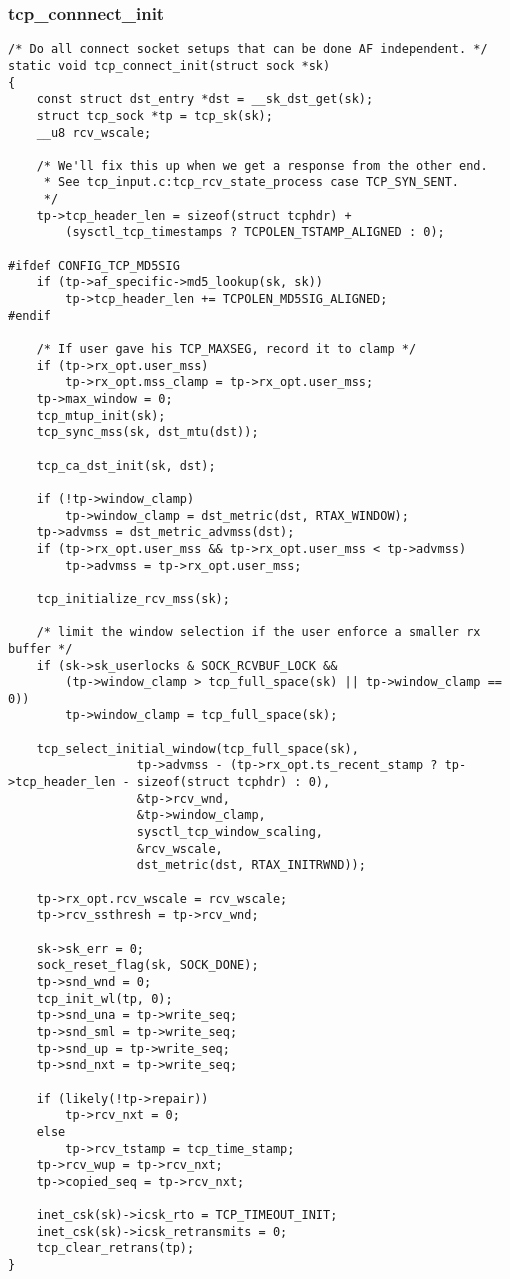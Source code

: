         \subsubsection{tcp\_connnect\_init}
            \label{TCPInitialize:tcp_connect_init}
\begin{verbatim}
/* Do all connect socket setups that can be done AF independent. */
static void tcp_connect_init(struct sock *sk)
{
    const struct dst_entry *dst = __sk_dst_get(sk);
    struct tcp_sock *tp = tcp_sk(sk);
    __u8 rcv_wscale;

    /* We'll fix this up when we get a response from the other end.
     * See tcp_input.c:tcp_rcv_state_process case TCP_SYN_SENT.
     */
    tp->tcp_header_len = sizeof(struct tcphdr) +
        (sysctl_tcp_timestamps ? TCPOLEN_TSTAMP_ALIGNED : 0);

#ifdef CONFIG_TCP_MD5SIG
    if (tp->af_specific->md5_lookup(sk, sk))
        tp->tcp_header_len += TCPOLEN_MD5SIG_ALIGNED;
#endif

    /* If user gave his TCP_MAXSEG, record it to clamp */
    if (tp->rx_opt.user_mss)
        tp->rx_opt.mss_clamp = tp->rx_opt.user_mss;
    tp->max_window = 0;
    tcp_mtup_init(sk);
    tcp_sync_mss(sk, dst_mtu(dst));

    tcp_ca_dst_init(sk, dst);

    if (!tp->window_clamp)
        tp->window_clamp = dst_metric(dst, RTAX_WINDOW);
    tp->advmss = dst_metric_advmss(dst);
    if (tp->rx_opt.user_mss && tp->rx_opt.user_mss < tp->advmss)
        tp->advmss = tp->rx_opt.user_mss;

    tcp_initialize_rcv_mss(sk);

    /* limit the window selection if the user enforce a smaller rx buffer */
    if (sk->sk_userlocks & SOCK_RCVBUF_LOCK &&
        (tp->window_clamp > tcp_full_space(sk) || tp->window_clamp == 0))
        tp->window_clamp = tcp_full_space(sk);

    tcp_select_initial_window(tcp_full_space(sk),
                  tp->advmss - (tp->rx_opt.ts_recent_stamp ? tp->tcp_header_len - sizeof(struct tcphdr) : 0),
                  &tp->rcv_wnd,
                  &tp->window_clamp,
                  sysctl_tcp_window_scaling,
                  &rcv_wscale,
                  dst_metric(dst, RTAX_INITRWND));

    tp->rx_opt.rcv_wscale = rcv_wscale;
    tp->rcv_ssthresh = tp->rcv_wnd;

    sk->sk_err = 0;
    sock_reset_flag(sk, SOCK_DONE);
    tp->snd_wnd = 0;
    tcp_init_wl(tp, 0);
    tp->snd_una = tp->write_seq;
    tp->snd_sml = tp->write_seq;
    tp->snd_up = tp->write_seq;
    tp->snd_nxt = tp->write_seq;

    if (likely(!tp->repair))
        tp->rcv_nxt = 0;
    else
        tp->rcv_tstamp = tcp_time_stamp;
    tp->rcv_wup = tp->rcv_nxt;
    tp->copied_seq = tp->rcv_nxt;

    inet_csk(sk)->icsk_rto = TCP_TIMEOUT_INIT;
    inet_csk(sk)->icsk_retransmits = 0;
    tcp_clear_retrans(tp);
}
\end{verbatim}

